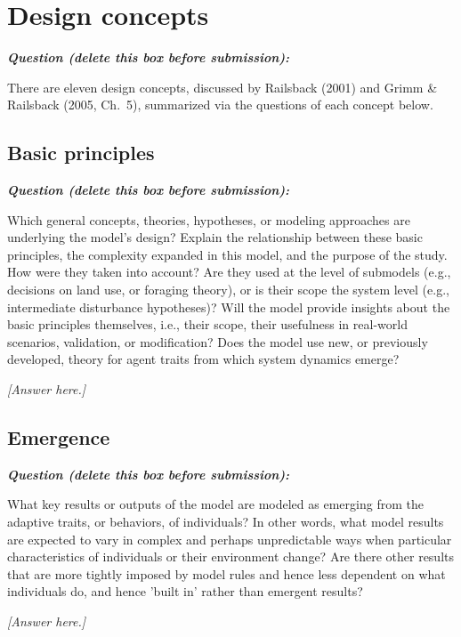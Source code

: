 \documentclass[11pt,a4paper]{article}
\newenvironment{question}
  {\begin{oddquestion}\small\itshape\color{oddquestioncolor}%
   \textbf{Question (delete this box before submission):}\par\smallskip}
  {\end{oddquestion}}
\begin{document}

\section{Design concepts}
\begin{question}
There are eleven design concepts, discussed by Railsback (2001) and
Grimm \& Railsback (2005, Ch.~5), summarized via the questions of each
concept below.
\end{question}

\subsection{Basic principles}
\begin{question}
Which general concepts, theories, hypotheses, or modeling approaches
are underlying the model's design? Explain the relationship between
these basic principles, the complexity expanded in this model, and the
purpose of the study. How were they taken into account? Are they used
at the level of submodels (e.g., decisions on land use, or foraging
theory), or is their scope the system level (e.g., intermediate
disturbance hypotheses)? Will the model provide insights about the
basic principles themselves, i.e., their scope, their usefulness in
real-world scenarios, validation, or modification? Does the model use
new, or previously developed, theory for agent traits from which system
dynamics emerge?
\end{question}
\textit{[Answer here.]}

\subsection{Emergence}
\begin{question}
What key results or outputs of the model are modeled as emerging from
the adaptive traits, or behaviors, of individuals? In other words, what
model results are expected to vary in complex and perhaps unpredictable
ways when particular characteristics of individuals or their environment
change? Are there other results that are more tightly imposed by model
rules and hence less dependent on what individuals do, and hence
'built in' rather than emergent results?
\end{question}
\textit{[Answer here.]}
\end{document}
